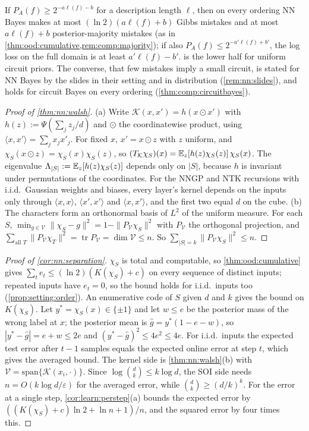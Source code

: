 \begin{remark}\label{rem:nn:bridge}
If $P_A(f)\ge2^{-a\ell(f)-b}$ for a description length $\ell$, then on every ordering NN Bayes makes at most $(\ln2)(a\ell(f)+b)$ Gibbs mistakes and at most $a\ell(f)+b$ posterior-majority mistakes (as in \cref{thm:ood:cumulative,rem:comp:majority}); if also $P_A(f)\le2^{-a'\ell(f)+b'}$, the log loss on the full domain is at least $a'\ell(f)-b'$.  is the lower half for uniform circuit priors. The converse, that few mistakes imply a small circuit, is stated for NN Bayes by the slides in their setting and in distribution (\cref{rem:nn:slides}), and holds for circuit Bayes on every ordering (\cref{thm:comp:circuitbayes}).
\end{remark}

\begin{proof}[Proof of \cref{thm:nn:walsh}]
(a) Write $\mathcal K(x,x')=h(x\odot x')$ with $h(z):=\Psi(\sum_jz_j/d)$ and $\odot$ the coordinatewise product, using $\langle x,x'\rangle=\sum_jx_jx'_j$. For fixed $x$, $x'=x\odot z$ with $z$ uniform, and $\chi_S(x\odot z)=\chi_S(x)\chi_S(z)$, so $(T_{\mathcal K}\chi_S)(x)=\mathbb{E}_z[h(z)\chi_S(z)]\,\chi_S(x)$. The eigenvalue $\Lambda_{|S|}:=\mathbb{E}_z[h(z)\chi_S(z)]$ depends only on $|S|$, because $h$ is invariant under permutations of the coordinates. For the NNGP and NTK recursions with i.i.d.\ Gaussian weights and biases, every layer's kernel depends on the inputs only through $\langle x,x\rangle$, $\langle x',x'\rangle$ and $\langle x,x'\rangle$, and the first two equal $d$ on the cube.
(b) The characters form an orthonormal basis of $L^2$ of the uniform measure. For each $S$, $\min_{g\in\mathcal V}\|\chi_S-g\|^2=1-\|P_{\mathcal V}\chi_S\|^2$ with $P_{\mathcal V}$ the orthogonal projection, and $\sum_{\text{all }T}\|P_{\mathcal V}\chi_T\|^2=\operatorname{tr}P_{\mathcal V}=\dim\mathcal V\le n$. So $\sum_{|S|=k}\|P_{\mathcal V}\chi_S\|^2\le n$.
\end{proof}

\begin{proof}[Proof of \cref{cor:nn:separation}]
$\chi_S$ is total and computable, so \cref{thm:ood:cumulative} gives $\sum_te_t\le(\ln2)(K(\chi_S)+c)$ on every sequence of distinct inputs; repeated inputs have $e_t=0$, so the bound holds for i.i.d.\ inputs too (\cref{prop:setting:order}). An enumerative code of $S$ given $d$ and $k$ gives the bound on $K(\chi_S)$. Let $y^*=\chi_S(x)\in\{\pm1\}$ and let $w\le e$ be the posterior mass of the wrong label at $x$; the posterior mean is $\hat g=y^*(1-e-w)$, so $|y^*-\hat g|=e+w\le2e$ and $(y^*-\hat g)^2\le4e^2\le4e$. For i.i.d.\ inputs the expected test error after $t-1$ samples equals the expected online error at step $t$, which gives the averaged bound. The kernel side is \cref{thm:nn:walsh}(b) with $\mathcal V=\mathrm{span}\{\mathcal K(x_i,\cdot)\}$. Since $\log\binom dk\le k\log d$, the SOI side needs $n=O(k\log d/\varepsilon)$ for the averaged error, while $\binom dk\ge(d/k)^k$. For the error at a single step, \cref{cor:learn:perstep}(a) bounds the expected error by $((K(\chi_S)+c)\ln2+\ln n+1)/n$, and the squared error by four times this.
\end{proof}

